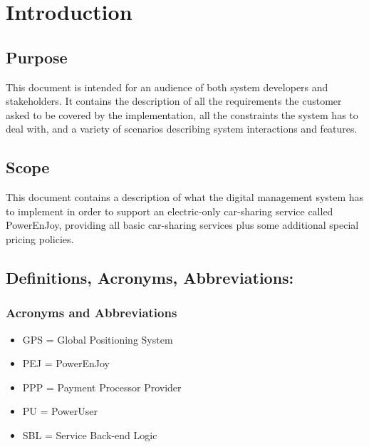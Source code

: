 \section{Introduction}
\subsection{Purpose}
This document is intended for an audience of both system developers and stakeholders. It contains the description of all the requirements the customer asked to be covered by the implementation, all the constraints the system has to deal with, and a variety of scenarios describing system interactions and features.
\subsection{Scope}
This document contains a description of what the digital management system has to implement in order to support an electric-only car-sharing service called PowerEnJoy, providing all basic car-sharing services plus some additional special pricing policies.
\subsection{Definitions, Acronyms, Abbreviations:}
\subsubsection{Acronyms and Abbreviations}
\begin{itemize}
\item GPS = Global Positioning System
\item PEJ = PowerEnJoy
\item PPP = Payment Processor Provider
\item PU = PowerUser
\item SBL = Service Back-end Logic
\end{itemize}

